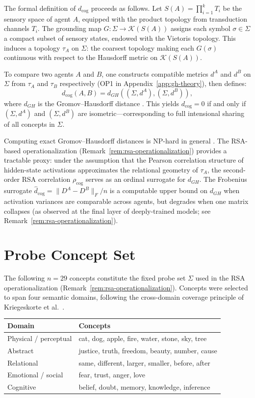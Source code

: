 \documentclass[12pt]{article}
\begin{document}
The formal definition of $d_\mathrm{cog}$ proceeds as follows.
Let $S(A) = \prod_{i=1}^{k} T_i$ be the sensory space of agent $A$,
equipped with the product topology from transduction channels $T_i$.
The grounding map $G: \Sigma \to \mathcal{K}(S(A))$ assigns each symbol
$\sigma \in \Sigma$ a compact subset of sensory states, endowed with the
Vietoris topology.
This induces a topology $\tau_A$ on $\Sigma$: the coarsest topology
making each $G(\sigma)$ continuous with respect to the Hausdorff metric
on $\mathcal{K}(S(A))$.

To compare two agents $A$ and $B$, one constructs compatible metrics
$d^A$ and $d^B$ on $\Sigma$ from $\tau_A$ and $\tau_B$ respectively
(OP1 in Appendix~\ref{app:gh-theory}), then defines:
\[
d_\mathrm{cog}(A, B) = d_{GH}((\Sigma, d^A), (\Sigma, d^B)),
\]
where $d_{GH}$ is the Gromov--Hausdorff distance \cite{gromov1981}.
This yields $d_\mathrm{cog} = 0$ if and only if $(\Sigma, d^A)$ and
$(\Sigma, d^B)$ are isometric---corresponding to full intensional
sharing of all concepts in $\Sigma$.

Computing exact Gromov--Hausdorff distances is NP-hard in general
\cite{memoli2007}.
The RSA-based operationalization (Remark~\ref{rem:rsa-operationalization})
provides a tractable proxy: under the assumption that the Pearson
correlation structure of hidden-state activations approximates the
relational geometry of $\tau_A$, the second-order RSA correlation
$\rho_\mathrm{cog}$ serves as an ordinal surrogate for $d_{GH}$.
The Frobenius surrogate $\hat{d}_\mathrm{cog} = \|D^A - D^B\|_F / n$
is a computable upper bound on $d_{GH}$ when activation variances are
comparable across agents, but degrades when one matrix collapses
(as observed at the final layer of deeply-trained models;
see Remark~\ref{rem:rsa-operationalization}).

\section{Probe Concept Set}
\label{app:probe-set}

The following $n = 29$ concepts constitute the fixed probe set $\Sigma$
used in the RSA operationalization (Remark~\ref{rem:rsa-operationalization}).
Concepts were selected to span four semantic domains, following the
cross-domain coverage principle of Kriegeskorte et al.\ \cite{kriegeskorte2008}.

\begin{center}
\begin{tabular}{ll}
\hline
Domain & Concepts \\
\hline
Physical / perceptual &
  cat, dog, apple, fire, water, stone, sky, tree \\
Abstract &
  justice, truth, freedom, beauty, number, cause \\
Relational &
  same, different, larger, smaller, before, after \\
Emotional / social &
  fear, trust, anger, love \\
Cognitive &
  belief, doubt, memory, knowledge, inference \\
\hline
\end{tabular}
\end{center}
\end{document}
